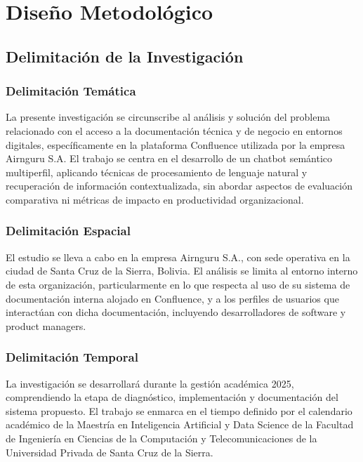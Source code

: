 \chapter{Diseño Metodológico}
\section{Delimitación de la Investigación}

\subsection{Delimitación Temática}

La presente investigación se circunscribe al análisis y solución del problema relacionado con el acceso a la documentación técnica y de negocio en entornos digitales, específicamente en la plataforma Confluence utilizada por la empresa Airnguru S.A. El trabajo se centra en el desarrollo de un chatbot semántico multiperfil, aplicando técnicas de procesamiento de lenguaje natural y recuperación de información contextualizada, sin abordar aspectos de evaluación comparativa ni métricas de impacto en productividad organizacional.

\subsection{Delimitación Espacial}

El estudio se lleva a cabo en la empresa Airnguru S.A., con sede operativa en la ciudad de Santa Cruz de la Sierra, Bolivia. El análisis se limita al entorno interno de esta organización, particularmente en lo que respecta al uso de su sistema de documentación interna alojado en Confluence, y a los perfiles de usuarios que interactúan con dicha documentación, incluyendo desarrolladores de software y product managers.

\subsection{Delimitación Temporal}

La investigación se desarrollará durante la gestión académica 2025, comprendiendo la etapa de diagnóstico, implementación y documentación del sistema propuesto. El trabajo se enmarca en el tiempo definido por el calendario académico de la Maestría en Inteligencia Artificial y Data Science de la Facultad de Ingeniería en Ciencias de la Computación y Telecomunicaciones de la Universidad Privada de Santa Cruz de la Sierra.


